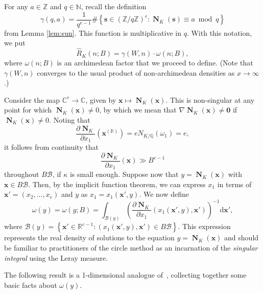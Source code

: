 \documentclass[11pt,letterpaper]{amsart}
\renewcommand{\d}{\mathrm{d}}
\theoremstyle{definition}
\numberwithin{equation}{section}
\newcommand\RR{\mathbb{R}}
\newcommand\ZZ{\mathbb{Z}}
\newcommand\NN{\mathbb{N}}
\newcommand\CC{\mathbb{C}}
\newcommand\QQ{\mathbb{Q}}
\newcommand{\x}{\mathbf{x}}
\DeclareMathOperator{\nf}{\mathbf{N}}
\newcommand{\0}{\mathbf{0}}
\begin{document}
For any $a\in \ZZ$ and  $q\in \NN$, recall the definition
\begin{equation}\label{eq:def-gamma}
\gamma(q,a)=
\frac{1}{q^{e-1}} 
\#\left\{ \mathbf{s}\in (\ZZ/q\ZZ)^e : 
\nf_K(\mathbf{s})\equiv a \bmod{q}
\right\}
\end{equation}
from Lemma \ref{lem:sun}.
This  function is multiplicative in $q$.
With this notation, we put
\begin{equation}\label{eq:def-hatR}
\hat R_K(n;B)= \gamma(W,n) \cdot \omega(n;B),
\end{equation}
where 
$\omega(n;B)$ is an  archimedean factor that we proceed to define. 
(Note that   $\gamma(W,n)$
 converges to the usual product of non-archimedean densities  as $x\to \infty$.)



Consider the map $\CC^e\to \CC$, given by  
$\mathbf{x}\mapsto \nf_K(\mathbf{x}).$ 
This is non-singular at any point for which 
$\nf_K(\mathbf{x})\neq 0$, by which we mean that 
$\nabla \nf_K(\mathbf{x})\neq \0$  if $\nf_K(\mathbf{x})\neq 0$.
Noting that 
$$
\frac{\partial \nf_K}{\partial x_1}(\x^{(\RR)})=eN_{K/\QQ}(\omega_1)=e,
$$
it follows from  continuity that 
\begin{equation}\label{eq:wave}
\frac{\partial \nf_K}{\partial x_1}(\x)\gg B^{e-1}
\end{equation}
throughout $B\mathcal{B}$, if $\kappa$ is small enough.
Suppose now that $y=\nf_K(\x)$ with $\x\in B\mathcal{B}$. Then, by the implicit function theorem, we can express $x_1$ in terms of $\x'=(x_2,\dots,x_e)$ and $y$ as $x_1=x_1(\x',y)$.  
We now define 
\begin{equation}\label{eq:define_omega}
\omega(y)=\omega(y;B)=
\int_{\mathcal{B}(y)} \left(\frac{\partial \nf_K}{\partial x_1}(x_1(\x',y),\x')\right)^{-1} \d\x',
\end{equation}
where 
$
\mathcal{B}(y)=\left\{\x'\in \RR^{e-1}: (x_1(\x',y),\x')\in B\mathcal{B}\right\}.
$
This expression represents the real density of 
solutions to the equation $y=\nf_K(\x)$ and 
should be familiar to practitioners of the circle method as an 
 incarnation of the 
{\em singular integral} using the 
Leray measure.

The following result 
is a 1-dimensional analogue of~\cite[Lemma 9]{gafa}, 
collecting together some basic facts about $\omega(y)$.
\end{document}
